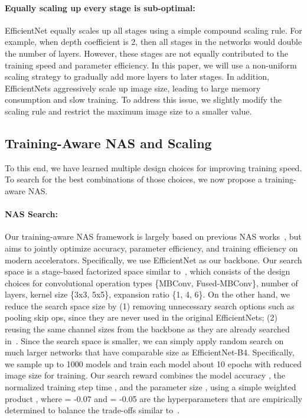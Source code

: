 \documentclass{article}
\begin{document}
\paragraph{Equally scaling up every stage is sub-optimal:} 
EfficientNet equally scales up all stages using a simple compound scaling rule. For example, when depth coefficient is 2, then all stages in the networks would double the number of layers. However, these stages are not equally contributed to the training speed and parameter efficiency. In this paper, we will use a non-uniform scaling strategy to gradually add more layers to later stages. In addition, EfficientNets aggressively scale up image size, leading to large memory consumption and slow training. To address this issue, we slightly modify the scaling rule and restrict the maximum image size to a smaller value.


\subsection{Training-Aware NAS and Scaling}

To this end, we have learned multiple design choices for improving training speed. To search for the best combinations of those choices, we now propose a training-aware NAS.

\paragraph{NAS Search:} Our training-aware NAS framework is largely based on previous NAS works~\cite{mnas19,efficientnet19}, but aims to jointly optimize accuracy, parameter efficiency, and training efficiency on modern accelerators. Specifically, we use EfficientNet as our backbone. Our search space is a stage-based factorized space similar to~\cite{mnas19}, which consists of the design choices for convolutional operation types \{MBConv, Fused-MBConv\}, number of layers, kernel size \{3x3, 5x5\}, expansion ratio \{1, 4, 6\}. On the other hand, we reduce the search space size by (1) removing unnecessary search options such as pooling skip ops, since they are never used in the original EfficientNets; (2) reusing the same channel sizes from the backbone as they are already searched in~\cite{efficientnet19}. Since the search space is smaller, we can simply apply random search on much larger networks that have comparable size as EfficientNet-B4. Specifically, we sample up to 1000 models and train each model about 10 epochs with reduced image size for training. Our search reward combines the model accuracy , the normalized training step time , and the parameter size , using a simple weighted product ,  where  = -0.07 and  = -0.05 are the hyperparameters that are empirically determined to balance the trade-offs similar to~\cite{mnas19}.
\end{document}
